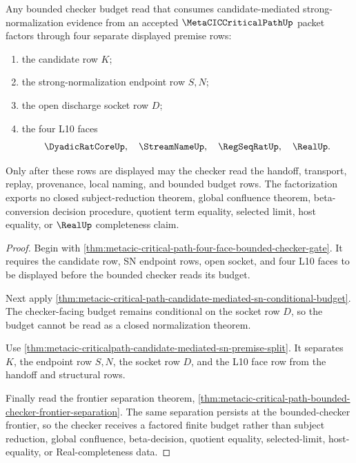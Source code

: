 \begin{theorem}
\label{thm:metacic-critical-path-bounded-checker-budget-factorization}
Any bounded checker budget read that consumes candidate-mediated strong-normalization evidence from an accepted $\MetaCICCriticalPathUp$ packet factors through four separate displayed premise rows:
\begin{enumerate}
\item the candidate row $K$;
\item the strong-normalization endpoint row $S,N$;
\item the open discharge socket row $D$;
\item the four L10 faces
$$
\DyadicRatCoreUp,\quad \StreamNameUp,\quad \RegSeqRatUp,\quad \RealUp .
$$
\end{enumerate}
Only after these rows are displayed may the checker read the handoff, transport, replay, provenance, local naming, and bounded budget rows. The factorization exports no closed subject-reduction theorem, global confluence theorem, beta-conversion decision procedure, quotient term equality, selected limit, host equality, or $\RealUp$ completeness claim.
\end{theorem}
\begin{proof}
Begin with \autoref{thm:metacic-critical-path-four-face-bounded-checker-gate}. It requires the candidate row, SN endpoint rows, open socket, and four L10 faces to be displayed before the bounded checker reads its budget.

Next apply \autoref{thm:metacic-critical-path-candidate-mediated-sn-conditional-budget}. The checker-facing budget remains conditional on the socket row $D$, so the budget cannot be read as a closed normalization theorem.

Use \autoref{thm:metacic-criticalpath-candidate-mediated-sn-premise-split}. It separates $K$, the endpoint row $S,N$, the socket row $D$, and the L10 face row from the handoff and structural rows.

Finally read the frontier separation theorem, \autoref{thm:metacic-critical-path-bounded-checker-frontier-separation}. The same separation persists at the bounded-checker frontier, so the checker receives a factored finite budget rather than subject reduction, global confluence, beta-decision, quotient equality, selected-limit, host-equality, or Real-completeness data.
\end{proof}


